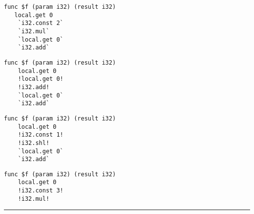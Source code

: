 
\lstset{
    language=WAT,
    style=nccode,
    basicstyle=\footnotesize\ttfamily,
    columns=fullflexible,
    breaklines=true
}


\begin{minipage}[t]{0.9\linewidth}
    \lstset{numbers=none}
    \noindent\begin{minipage}[t]{.45\linewidth}
    \begin{lstlisting}[xleftmargin=1em,escapechar=?]
func $f (param i32) (result i32)
   local.get 0
    `i32.const 2`
    `i32.mul`
    `local.get 0`
    `i32.add`

        \end{lstlisting}
\begin{lstlisting}[xleftmargin=1em,escapechar=?]
func $f (param i32) (result i32)
    local.get 0
    !local.get 0!
    !i32.add!
    `local.get 0`
    `i32.add`

                \end{lstlisting}
    \end{minipage}\hfill
    \noindent\begin{minipage}[t]{.45\linewidth}
\begin{lstlisting}[xleftmargin=1em,escapechar=?]
func $f (param i32) (result i32)
    local.get 0
    !i32.const 1!
    !i32.shl!
    `local.get 0`
    `i32.add`

    \end{lstlisting}
\begin{lstlisting}[xleftmargin=1em,escapechar=?]
func $f (param i32) (result i32)
    local.get 0
    !i32.const 3!
    !i32.mul!

        \end{lstlisting}
    \end{minipage}

    \centering
    \hrule
    \vspace{2mm}
    \label{example:crow:variants:wasm}
\end{minipage}


